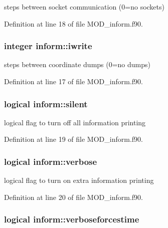steps between socket communication (0=no sockets) 



Definition at line 18 of file M\-O\-D\-\_\-inform.\-f90.

\hypertarget{classinform_a4ffbb5750ff45ca31a35320cbe0d8ff6}{
\subsubsection[{iwrite}]{\setlength{\rightskip}{0pt plus 5cm}integer inform\-::iwrite}}\label{classinform_a4ffbb5750ff45ca31a35320cbe0d8ff6}


steps between coordinate dumps (0=no dumps) 



Definition at line 17 of file M\-O\-D\-\_\-inform.\-f90.

\hypertarget{classinform_a74292c5447b930476798d480fb1f1755}{
\subsubsection[{silent}]{\setlength{\rightskip}{0pt plus 5cm}logical inform\-::silent}}\label{classinform_a74292c5447b930476798d480fb1f1755}


logical flag to turn off all information printing 



Definition at line 19 of file M\-O\-D\-\_\-inform.\-f90.

\hypertarget{classinform_abf72f950558f41a53ede4b76c1db5960}{
\subsubsection[{verbose}]{\setlength{\rightskip}{0pt plus 5cm}logical inform\-::verbose}}\label{classinform_abf72f950558f41a53ede4b76c1db5960}


logical flag to turn on extra information printing 



Definition at line 20 of file M\-O\-D\-\_\-inform.\-f90.

\hypertarget{classinform_a2d1a4bc4e4b22f41eeb347c67e4073a4}{
\subsubsection[{verboseforcestime}]{\setlength{\rightskip}{0pt plus 5cm}logical inform\-::verboseforcestime}}\label{classinform_a2d1a4bc4e4b22f41eeb347c67e4073a4}


